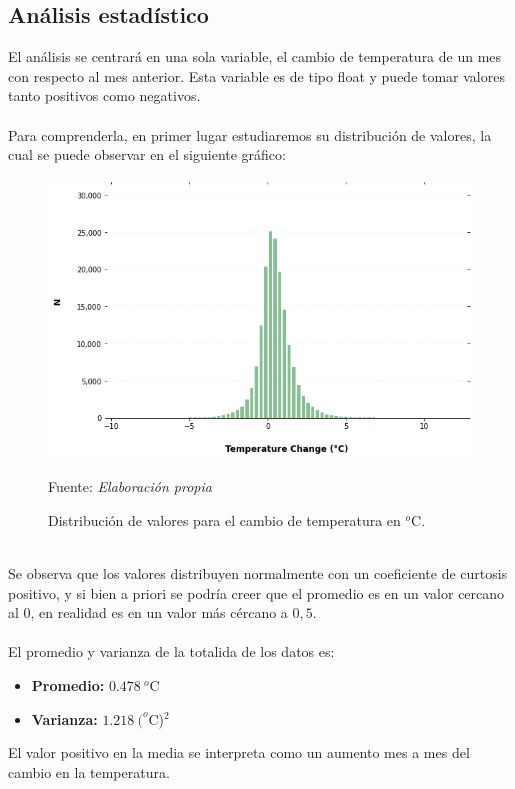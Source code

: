 \documentclass[12pt]{article}
\newcommand{\source}[1]{\caption*{Fuente: {\textit{#1}}} }
\begin{document}
\subsection{Análisis estadístico}
El análisis se centrará en una sola variable, el cambio de temperatura de un mes con respecto al mes anterior. Esta variable es de tipo float y puede tomar valores tanto positivos como negativos.\\ \\
Para comprenderla, en primer lugar estudiaremos su distribución de valores, la cual se puede observar en el siguiente gráfico:
\begin{figure}[H]
    \centering
    \includegraphics[scale=0.65]{fig/fig_1.png}
    \caption{Distribución de valores para el cambio de temperatura en $^o$C.}
    \vspace{-0.3cm}
    \source{Elaboración propia}
    \label{fig:fig_1}
\end{figure}\\
Se observa que los valores distribuyen normalmente con un coeficiente de curtosis positivo, y si bien a priori se podría creer que el promedio es en un valor cercano al 0, en realidad es en un valor más cércano a $0,5$.\\ \\
El promedio y varianza de la totalida de los datos es:
\begin{multicols}{2}
\begin{itemize}
    \item \textbf{Promedio:} $0.478\ ^o$C
    \item \textbf{Varianza:} $1.218\ (^o$C)$^2$
\end{itemize}
\end{multicols}
El valor positivo en la media se interpreta como un aumento mes a mes del cambio en la temperatura.\\ \\
\end{document}
